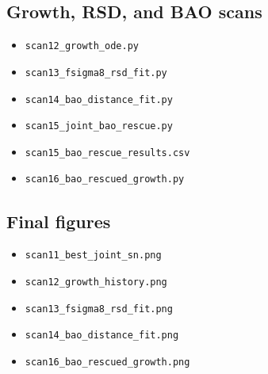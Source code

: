\documentclass[11pt,a4paper]{article}
\begin{document}
\subsection{Growth, RSD, and BAO scans}
\begin{itemize}
\item \texttt{scan12\_growth\_ode.py}
\item \texttt{scan13\_fsigma8\_rsd\_fit.py}
\item \texttt{scan14\_bao\_distance\_fit.py}
\item \texttt{scan15\_joint\_bao\_rescue.py}
\item \texttt{scan15\_bao\_rescue\_results.csv}
\item \texttt{scan16\_bao\_rescued\_growth.py}
\end{itemize}

\subsection{Final figures}
\begin{itemize}
\item \texttt{scan11\_best\_joint\_sn.png}
\item \texttt{scan12\_growth\_history.png}
\item \texttt{scan13\_fsigma8\_rsd\_fit.png}
\item \texttt{scan14\_bao\_distance\_fit.png}
\item \texttt{scan16\_bao\_rescued\_growth.png}
\end{itemize}
\end{document}
